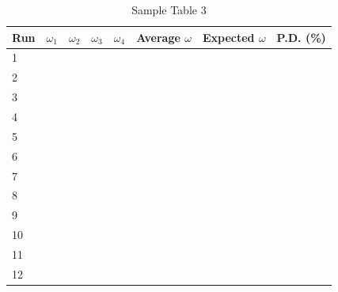 \begin{table}[ht!]
    \begin{center}
        \begin{tabular}{l|l|l|l|l|l|l|l}
            \textbf{Run} & $\omega_{1}$ & $\omega_{2}$ & $\omega_{3}$ & $\omega_{4}$ & Average $\omega$ & Expected $\omega$ & P.D. (\%) \\
            \hline
            1 & & & & & & & \\
            2 & & & & & & & \\
            3 & & & & & & & \\
            \hline
            4 & & & & & & & \\
            5 & & & & & & & \\
            6 & & & & & & & \\
            \hline
            7 & & & & & & & \\
            8 & & & & & & & \\
            9 & & & & & & & \\
            \hline
            10 & & & & & & & \\
            11 & & & & & & & \\
            12 & & & & & & & \\
            \hline
        \end{tabular}
    \end{center}
    \caption{Sample Table 3}
\end{table}
%
\newpage
